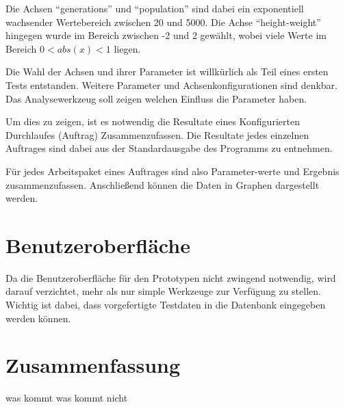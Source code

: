 Die Achsen ``generations'' und ``population'' sind dabei ein exponentiell wachsender Wertebereich zwischen 20 und 5000.
Die Achse ``height-weight'' hingegen wurde im Bereich zwischen -2 und 2 gewählt,
wobei viele Werte im Bereich $ 0<abs(x)<1$ liegen.

Die Wahl der Achsen und ihrer Parameter ist willkürlich als Teil eines ersten Tests entstanden.
Weitere Parameter und Achsenkonfigurationen sind denkbar.
Das Analysewerkzeug soll zeigen welchen Einfluss die Parameter haben.

Um dies zu zeigen, ist es notwendig die Resultate
eines Konfigurierten Durchlaufes (Auftrag) Zusammenzufassen.
Die Resultate jedes einzelnen Auftrages sind dabei aus der Standardausgabe
des Programms zu entnehmen.

Für jedes Arbeitspaket eines Auftrages sind also Parameter-werte und Ergebnis zusammenzufassen.
Anschließend können die Daten in Graphen dargestellt werden.


\section{Benutzeroberfläche}

Da die Benutzeroberfläche für den Prototypen nicht zwingend notwendig,
wird darauf verzichtet, mehr als nur simple Werkzeuge zur Verfügung zu stellen.
Wichtig ist dabei, dass vorgefertigte Testdaten in die Datenbank eingegeben werden können.


\section{Zusammenfassung}

was kommt
was kommt nicht
